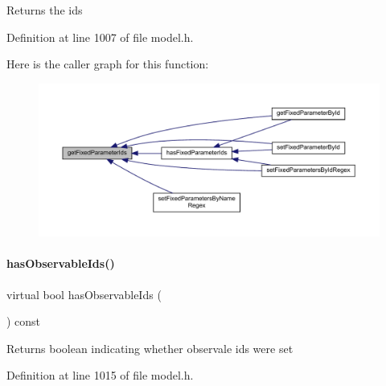 \begin{DoxyReturn}{Returns}
the ids 
\end{DoxyReturn}


Definition at line 1007 of file model.\+h.

Here is the caller graph for this function\+:
\nopagebreak
\begin{figure}[H]
\begin{center}
\leavevmode
\includegraphics[width=350pt]{classamici_1_1_model_a802aef820cb7ddabfb6330abba320bcf_icgraph}
\end{center}
\end{figure}
\mbox{\label{classamici_1_1_model_adb0d2d3b3aa9cd648efa3cf408d9abab}} 
\paragraph{\texorpdfstring{has\+Observable\+Ids()}{hasObservableIds()}}
{\footnotesize\ttfamily virtual bool has\+Observable\+Ids (\begin{DoxyParamCaption}{ }\end{DoxyParamCaption}) const\hspace{0.3cm}{\ttfamily [virtual]}}

\begin{DoxyReturn}{Returns}
boolean indicating whether observale ids were set 
\end{DoxyReturn}


Definition at line 1015 of file model.\+h.

